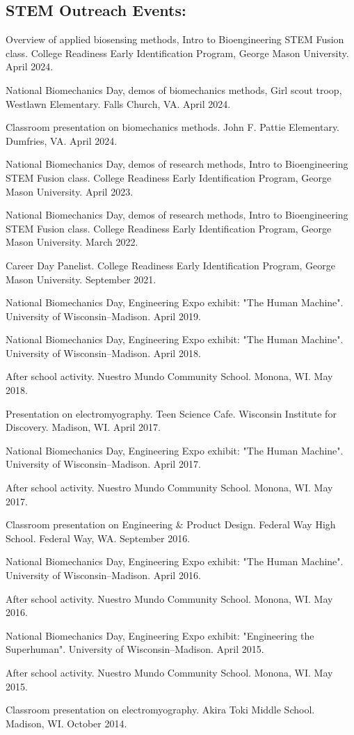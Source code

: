 \documentclass[letterpaper, 10pt]{article}
\begin{document}
\subsection{STEM Outreach Events:}
\begin{compactenum}
    \item Overview of applied biosensing methods, Intro to Bioengineering STEM Fusion class. College Readiness Early Identification Program, George Mason University. April 2024.
    \item National Biomechanics Day, demos of biomechanics methods, Girl scout troop, Westlawn Elementary. Falls Church, VA. April 2024.
    \item Classroom presentation on biomechanics methods. John F. Pattie Elementary. Dumfries, VA. April 2024.
    \item National Biomechanics Day, demos of research methods, Intro to Bioengineering STEM Fusion class. College Readiness Early Identification Program, George Mason University. April 2023.
    \item National Biomechanics Day, demos of research methods, Intro to Bioengineering STEM Fusion class. College Readiness Early Identification Program, George Mason University. March 2022.
    \item Career Day Panelist. College Readiness Early Identification Program, George Mason University. September 2021.
    \item National Biomechanics Day, Engineering Expo exhibit: "The Human Machine". University of Wisconsin–Madison. April 2019. 
    \item National Biomechanics Day, Engineering Expo exhibit: "The Human Machine". University of Wisconsin–Madison. April 2018. 
    \item After school activity. Nuestro Mundo Community School. Monona, WI. May 2018.
    \item Presentation on electromyography. Teen Science Cafe. Wisconsin Institute for Discovery. Madison, WI. April 2017.
    \item National Biomechanics Day, Engineering Expo exhibit: "The Human Machine". University of Wisconsin–Madison. April 2017.
    \item After school activity. Nuestro Mundo Community School. Monona, WI. May 2017.
    \item Classroom presentation on Engineering \& Product Design. Federal Way High School. Federal Way, WA. September 2016.
    \item National Biomechanics Day, Engineering Expo exhibit: "The Human Machine". University of Wisconsin–Madison. April 2016.
    \item After school activity. Nuestro Mundo Community School. Monona, WI. May 2016.
    \item National Biomechanics Day, Engineering Expo exhibit: "Engineering the Superhuman". University of Wisconsin–Madison. April 2015.
    \item After school activity. Nuestro Mundo Community School. Monona, WI. May 2015.
    \item Classroom presentation on electromyography. Akira Toki Middle School. Madison, WI. October 2014. 
\end{compactenum}
\end{document}
